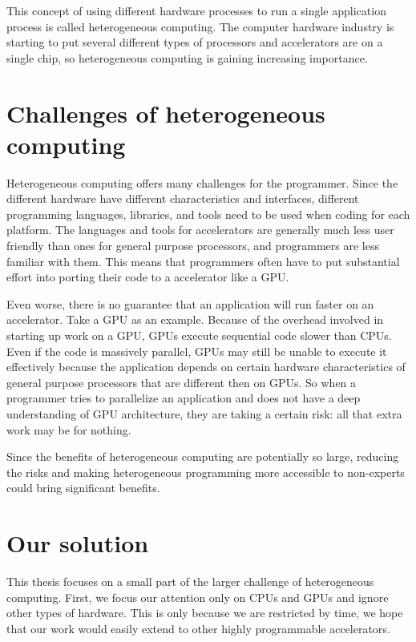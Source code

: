 \documentclass[12pt,twoside]{reedthesis}
\begin{document}
		This concept of using different hardware processes to run a single application process is called heterogeneous computing. 
		The computer hardware industry is starting to put several different types of processors and accelerators are on a single chip, so heterogeneous computing is gaining increasing importance.
		
		
	\section{Challenges of heterogeneous computing}
	
		Heterogeneous computing offers many challenges for the programmer. Since the different hardware have different characteristics and interfaces, different programming languages, libraries, and tools need to be used when coding for each platform. The languages and tools for accelerators are generally much less user friendly than ones for general purpose processors, and programmers are less familiar with them. %
		This means that programmers often have to put substantial effort into porting their code to a accelerator like a GPU.
		
		Even worse, there is no guarantee that an application will run faster on an accelerator. Take a GPU as an example. Because of the overhead involved in starting up work on a GPU, GPUs execute sequential code slower than CPUs. Even if the code is massively parallel, GPUs may still be unable to execute it effectively because the application depends on certain hardware characteristics of general purpose processors that are different then on GPUs. %
		So when a programmer tries to parallelize an application and does not have a deep understanding of GPU architecture, they are taking a certain risk: all that extra work may be for nothing. 
		
		Since the benefits of heterogeneous computing are potentially so large, reducing the risks and making heterogeneous programming more accessible to non-experts could bring significant benefits.
		
	\section{Our solution}
	
		This thesis focuses on a small part of the larger challenge of heterogeneous computing. First, we focus our attention only on CPUs and GPUs and ignore other types of hardware. This is only because we are restricted by time, we hope that our work would easily extend to other highly programmable accelerators.%
		
\end{document}
